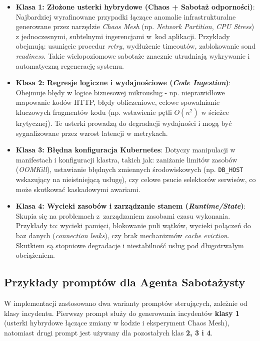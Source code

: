 \begin{itemize}
    \item \textbf{Klasa 1: Złożone usterki hybrydowe (Chaos + Sabotaż odporności)}: Najbardziej wyrafinowane przypadki łączące anomalie infrastrukturalne generowane przez narzędzie \textit{Chaos Mesh} (np. \textit{Network Partition}, \textit{CPU Stress}) z jednoczesnymi, subtelnymi ingerencjami w~kod aplikacji. \newline Przykłady obejmują: usunięcie procedur \textit{retry}, wydłużenie timeoutów, zablokowanie sond \textit{readiness}. Takie wielopoziomowe sabotaże znacznie utrudniają wykrywanie i automatyczną regenerację systemu.
    
    \item \textbf{Klasa 2: Regresje logiczne i wydajnościowe (\textit{Code Ingestion})}: Obejmuje błędy w logice biznesowej mikrousług - np. nieprawidłowe mapowanie kodów HTTP, błędy obliczeniowe, celowe spowalnianie kluczowych fragmentów kodu (np. wstawienie pętli $O(n^2)$ w ścieżce krytycznej). Te usterki prowadzą do degradacji wydajności i mogą być sygnalizowane przez wzrost latencji w metrykach.
    
    \item \textbf{Klasa 3: Błędna konfiguracja Kubernetes}: Dotyczy manipulacji w manifestach i konfiguracji klastra, takich jak: zaniżanie limitów zasobów (\textit{OOMKill}), ustawianie błędnych zmiennych środowiskowych (np. \texttt{DB\_HOST} wskazujący na nieistniejącą usługę), czy celowe psucie selektorów serwisów, co może skutkować kaskadowymi awariami.
    
    \item \textbf{Klasa 4: Wycieki zasobów i zarządzanie stanem (\textit{Runtime/State})}: Skupia się na problemach z zarządzaniem zasobami czasu wykonania. Przykłady to: wycieki pamięci, blokowanie puli wątków, wycieki połączeń do baz danych (\textit{connection leaks}), czy brak mechanizmów \textit{cache eviction}. Skutkiem są stopniowe degradacje i niestabilność usług pod długotrwałym obciążeniem.
\end{itemize}

\subsection{Przykłady promptów dla Agenta Sabotażysty}
W implementacji zastosowano dwa warianty promptów sterujących, zależnie od klasy incydentu. Pierwszy prompt służy do generowania incydentów \textbf{klasy 1} (usterki hybrydowe łączące zmiany w kodzie i eksperyment Chaos Mesh), natomiast drugi prompt jest używany dla pozostałych klas \textbf{2, 3 i 4}.

